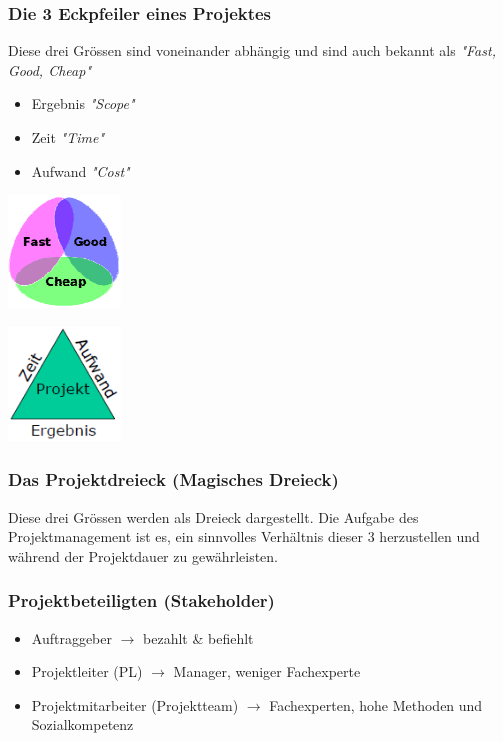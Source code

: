 \subsubsection{Die 3 Eckpfeiler eines Projektes}
\begin{minipage}{10cm}
	Diese drei Grössen sind voneinander abhängig und sind auch bekannt als \textit{"Fast, Good, Cheap"}
	\begin{itemize}
		\item Ergebnis \textit{"Scope"}
		\item Zeit \textit{"Time"}
		\item Aufwand \textit{"Cost"}
	\end{itemize}
\end{minipage}
\begin{minipage}{3cm}
	\includegraphics[width=3cm]{images/eckpfeiler.png}
\end{minipage}
\begin{minipage}{3cm}
	\includegraphics[width=3cm]{images/dreieck.png}
\end{minipage}

\subsubsection{Das Projektdreieck (Magisches Dreieck)}
\begin{minipage}{15cm}
	Diese drei Grössen werden als Dreieck dargestellt. Die Aufgabe des Projektmanagement ist es, ein sinnvolles Verhältnis dieser 3 herzustellen und während der Projektdauer zu gewährleisten. 
\end{minipage}

\subsubsection{Projektbeteiligten (Stakeholder)}
\begin{itemize}
	\item Auftraggeber $\rightarrow$ bezahlt \& befiehlt
	\item Projektleiter (PL) $\rightarrow$ Manager, weniger Fachexperte
	\item Projektmitarbeiter (Projektteam) $\rightarrow$ Fachexperten, hohe Methoden und Sozialkompetenz
\end{itemize}

